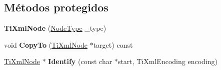 \subsection*{Métodos protegidos}
\begin{DoxyCompactItemize}
\item 
\hypertarget{class_ti_xml_node_a3f46721695868667113c7487ff123f20}{{\bfseries Ti\-Xml\-Node} (\hyperlink{class_ti_xml_node_a836eded4920ab9e9ef28496f48cd95a2}{Node\-Type} \-\_\-type)}\label{class_ti_xml_node_a3f46721695868667113c7487ff123f20}

\item 
\hypertarget{class_ti_xml_node_ab6056978923ad8350fb5164af32d8038}{void {\bfseries Copy\-To} (\hyperlink{class_ti_xml_node}{Ti\-Xml\-Node} $\ast$target) const }\label{class_ti_xml_node_ab6056978923ad8350fb5164af32d8038}

\item 
\hypertarget{class_ti_xml_node_ac1e3a8e7578be463b04617786120c2bb}{\hyperlink{class_ti_xml_node}{Ti\-Xml\-Node} $\ast$ {\bfseries Identify} (const char $\ast$start, Ti\-Xml\-Encoding encoding)}\label{class_ti_xml_node_ac1e3a8e7578be463b04617786120c2bb}

\end{DoxyCompactItemize}
